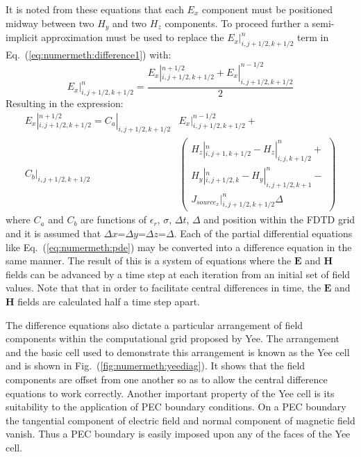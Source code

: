 \documentclass[a4paper, 12pt]{article}
\newcommand{\eq}[1]{Eq.\ (\ref{#1})}
\newcommand{\rfig}[1]{Fig.\ (\ref{#1})}
\begin{document}
	It is noted from these equations that each $E_x$ component must be
	positioned midway between two $H_y$ and two $H_z$ components. To
	proceed further a semi-implicit approximation must be used to replace
	the $E_x|^n_{i,j+1/2,k+1/2}$ term in \eq{eq:numermeth:difference1} with:
	\begin{equation}
		E_x|^n_{i,j+1/2,k+1/2}=\frac{E_x|^{n+1/2}_{i,j+1/2,k+1/2} + E_x|^{n-1/2}_{i,j+1/2,k+1/2}}{2}
		\label{eq:numermeth:semiimp}
	\end{equation}
	Resulting in the expression:
	\begin{align}
		E_x|^{n+1/2}_{i,j+1/2,k+1/2}=C_a|_{i,j+1/2,k+1/2}&E_x|^{n-1/2}_{i,j+1/2,k+1/2}+\nonumber\\
		C_b|_{i,j+1/2,k+1/2}&\left(\begin{array}{c}H_z|^n_{i,j+1,k+1/2} -
			H_z|^n_{i,j,k+1/2}+\\H_y|^n_{i,j+1/2,k}-H_y|^n_{i,j+1/2,k+1}-\\{J_{source_x}}|^n_{i,j+1/2,k+1/2}\Delta\end{array}
		\right)
	\end{align}
	where $C_a$ and $C_b$ are functions of $\epsilon_r$, $\sigma$, $\Delta
	t$, $\Delta$ and position within the FDTD grid and it is assumed
	that $\Delta x$=$\Delta y$=$\Delta z$=$\Delta$. Each of the partial differential
	equations like \eq{eq:numermeth:pde} may be converted into a
	difference equation in the same manner. The result of this is a system
	of equations where the $\mathbf{E}$ and $\mathbf{H}$ fields can be
	advanced by a time step at each iteration from an initial set of field
	values. Note that that in order to facilitate central differences in
	time, the $\mathbf{E}$ and $\mathbf{H}$ fields are calculated half a
	time step apart.

	The difference equations also dictate a particular arrangement of
	field components within the computational grid proposed by Yee. The
	arrangement and the basic cell used to demonstrate this arrangement is
	known as the Yee cell and is shown in \rfig{fig:numermeth:yeediag}. It
	shows that the field components are offset from one another so as to
	allow the central difference equations to work correctly. Another
	important property of the Yee cell is its suitability to the
	application of PEC boundary conditions. On a PEC boundary the
	tangential component of electric field and normal component of
	magnetic field vanish. Thus a PEC boundary is easily imposed upon any
	of the faces of the Yee cell.
\end{document}
